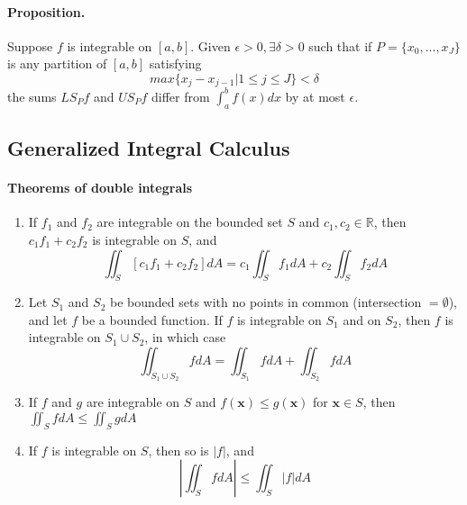 \documentclass[11pt]{article}
\newcommand{\bx}[0]{\mathbf{x}}
\newcommand{\real}[0]{\mathbb{R}}
\begin{document}
\paragraph{Proposition.} Suppose $f$ is integrable on $[a,b]$. Given $\epsilon>0, \exists \delta > 0$ such that if $P= \{x_0,...,x_J\}$ is any partition of $[a,b]$ satisfying
\begin{equation*}
    max\{x_j-x_{j-1} | 1\leq j \leq J\} < \delta
\end{equation*}
the sums $LS_Pf$ and $US_Pf$ differ from $\int_a^bf(x)dx$ by at most $\epsilon$.

\subsection{Generalized Integral Calculus}
\paragraph{Theorems of double integrals}
\begin{enumerate}
    \item If $f_1$ and $f_2$ are integrable on the bounded set $S$ and $c_1,c_2\in \real$, then $c_1f_1 + c_2f_2$ is integrable on $S$, and
    \begin{equation*}
        \iint_S[c_1f_1 + c_2f_2]dA = c_1\iint_Sf_1dA + c_2\iint_Sf_2dA
    \end{equation*}
    
    \item Let $S_1$ and $S_2$ be bounded sets with no points in common (intersection $ =\emptyset$), and let $f$ be a bounded function. If $f$ is integrable on $S_1$ and on $S_2$, then $f$ is integrable on $S_1\cup S_2$, in which case
    \begin{equation*}
        \iint_{S_1\cup S_2}fdA = \iint_{S_1}fdA + \iint_{S_2} fdA
    \end{equation*}
    
    \item If $f$ and $g$ are integrable on $S$ and $f(\mathbf{x})\leq g(\mathbf{x})$ for $\bx \in S$, then $\iint_S fdA \leq \iint_S g dA$
    
    \item If $f$ is integrable on $S$, then so is $|f|$, and
    \begin{equation*}
        \left|\iint_Sf dA\right| \leq \iint_S|f|dA
    \end{equation*}
\end{enumerate}
\end{document}
